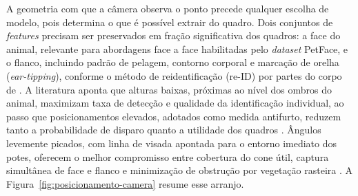 A geometria com que a câmera observa o ponto precede qualquer escolha de modelo, pois determina o que é possível extrair do quadro. Dois conjuntos de \textit{features} precisam ser preservados em fração significativa dos quadros: a face do animal, relevante para abordagens face a face habilitadas pelo \textit{dataset} PetFace, e o flanco, incluindo padrão de pelagem, contorno corporal e marcação de orelha (\textit{ear-tipping}), conforme o método de reidentificação (re-ID) por partes do corpo de . A literatura aponta que alturas baixas, próximas ao nível dos ombros do animal, maximizam taxa de detecção e qualidade da identificação individual, ao passo que posicionamentos elevados, adotados como medida antifurto, reduzem tanto a probabilidade de disparo quanto a utilidade dos quadros \cite{seidlitz2020height,beukes2025refining,meek2016higher}. Ângulos levemente picados, com linha de visada apontada para o entorno imediato dos potes, oferecem o melhor compromisso entre cobertura do cone útil, captura simultânea de face e flanco e minimização de obstrução por vegetação rasteira \cite{beukes2025refining,moll2020viewshed}. A Figura~\ref{fig:posicionamento-camera} resume esse arranjo.


